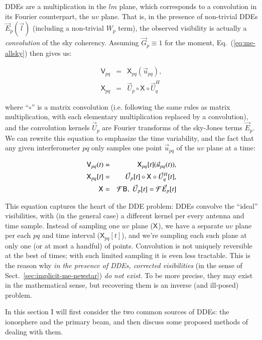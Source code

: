 \documentclass{aa}
\newcommand{\herm}{H}
\newcommand{\jones}[2]{\vec {#1}_{#2}}
\newcommand{\jonesT}[2]{\vec {#1}^{\herm}_{#2}}
\newcommand{\coh}[2]{\mathsf{{#1}}_{{#2}}}
\begin{document}
DDEs are a multiplication in the $lm$ plane, which corresponds to a convolution in its Fourier counterpart, the $uv$ plane. That is, in the presence of non-trivial DDEs $\jones{E}{p}(\vec l)$ (including a non-trivial $W_p$ term), the observed visibility is actually a \emph{convolution} of the sky coherency. Assuming $\jones{G}{p}\equiv1$ for the moment, Eq.~(\ref{eq:me-allsky}) then gives us:

\begin{eqnarray}\label{eq:dde-convolution}
\nonumber \coh{V}{pq} & = & \coh{X}{pq}(\vec u_{pq}), \\
\coh{X}{pq} &=& \jones{U}{p} \circ \coh{X}{} \circ \jonesT{U}{q}
\end{eqnarray}

where ``$\circ$'' is a matrix convolution (i.e. following the same rules as matrix multiplication, with each elementary multiplication replaced by a convolution), and the convolution kernels $\jones{U}{p}$ are Fourier transforms of the
sky-Jones terms $\jones{E}{p}$. We can rewrite this equation to emphasize the time variability, and the fact that any given interferometer $pq$ only samples one point $\vec u_{pq}$ of the $uv$ plane at a time:

\begin{eqnarray}\label{eq:dde-convolution-t}
\coh{V}{pq}(t) & = & \coh{X}{pq}[t](\vec u_{pq}(t)), \\
\nonumber \coh{X}{pq}[t] & = & \jones{U}{p}[t] \circ \coh{X}{} \circ \jonesT{U}{q}[t], \\
\nonumber \coh{X}{} & = & {\cal F} \coh{B}{}, \; \jones{U}{p}[t] = {\cal F}\jones{E}{p}[t]
\end{eqnarray}

This equation captures the heart of the DDE problem: DDEs convolve the ``ideal'' visibilities, with (in the general case) a different kernel per every antenna and time sample. Instead of sampling one $uv$ plane ($\coh{X}{}$), we have a separate $uv$ plane per each $pq$ and time interval ($\coh{X}{pq}[t]$), and we're sampling each such plane at only one (or at most a handful) of points. Convolution is not uniquely reversible at the best of times; with such limited sampling it is even less tractable. This is the reason why \emph{in the presence of DDEs, corrected visibilities} (in the sense of Sect.~\ref{sec:implicit-me-newstar}) \emph{do not exist.} To be more precise, they may exist in the mathematical sense, but recovering them is an inverse (and ill-posed) problem.

In this section I will first consider the two common sources of DDEs: the ionosphere and the primary beam, and
then discuss some proposed methods of dealing with them.
\end{document}
